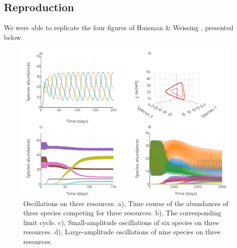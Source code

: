 \subsection{Reproduction}

We were able to replicate the four figures of Huisman \& Weissing \cite{1999:Huisman}, presented below. 

\begin{figure}[H]
\begin{center} 
 \includegraphics[width=1\textwidth]{../Code/Figures/Figure_1.pdf}
  \caption{Oscillations on three resources. a), Time course of the abundances of three species competing for three resources. b), The corresponding limit cycle. c), Small-amplitude oscillations of six species on three resources. d), Large-amplitude oscillations of nine species on three resources.}
  \label{figures:Fig1}
\end{center}
\end{figure}

